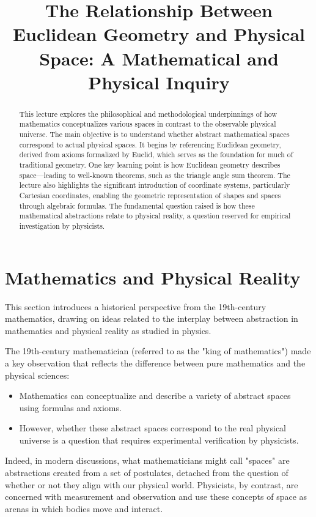 \documentclass[12pt,a4paper]{article}
\title{The Relationship Between Euclidean Geometry and Physical Space: A Mathematical and Physical Inquiry}
\newenvironment{rembox}[1][]{%
  \begin{tcolorbox}[enhanced, breakable, colback=gray!5, colframe=gray!50, title=#1, fonttitle=\bfseries, arc=3pt, boxrule=0.5pt]
}{\end{tcolorbox}}
\begin{document}
\maketitle
\begin{abstract}This lecture explores the philosophical and methodological underpinnings of how mathematics conceptualizes various spaces in contrast to the observable physical universe. The main objective is to understand whether abstract mathematical spaces correspond to actual physical spaces. It begins by referencing Euclidean geometry, derived from axioms formalized by Euclid, which serves as the foundation for much of traditional geometry. One key learning point is how Euclidean geometry describes space—leading to well-known theorems, such as the triangle angle sum theorem. The lecture also highlights the significant introduction of coordinate systems, particularly Cartesian coordinates, enabling the geometric representation of shapes and spaces through algebraic formulas. The fundamental question raised is how these mathematical abstractions relate to physical reality, a question reserved for empirical investigation by physicists.\end{abstract}

\section{Mathematics and Physical Reality}
This section introduces a historical perspective from the 19th-century mathematics, drawing on ideas related to the interplay between abstraction in mathematics and physical reality as studied in physics.

\begin{rembox}[Mathematics vs. Physics]
The 19th-century mathematician (referred to as the "king of mathematics") made a key observation that reflects the difference between pure mathematics and the physical sciences:
\begin{itemize}
    \item Mathematics can conceptualize and describe a variety of abstract spaces using formulas and axioms.
    \item However, whether these abstract spaces correspond to the real physical universe is a question that requires experimental verification by physicists.
\end{itemize}
\end{rembox}

Indeed, in modern discussions, what mathematicians might call "spaces" are abstractions created from a set of postulates, detached from the question of whether or not they align with our physical world. Physicists, by contrast, are concerned with measurement and observation and use these concepts of space as arenas in which bodies move and interact.
\end{document}
